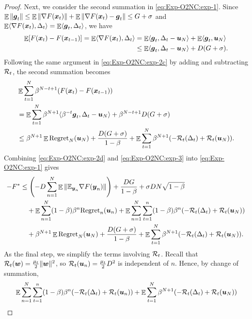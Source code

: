 \begin{proof}
Next, we consider the second summation in \eqref{eq:Exp-O2NC:exp-1}. Since $\mathop{\mathbb{E}}\|{\boldsymbol{g}}_t\| \le \mathop{\mathbb{E}}\|\nabla F({\boldsymbol{x}}_t)\| + \mathop{\mathbb{E}}\|\nabla F({\boldsymbol{x}}_t)-{\boldsymbol{g}}_t\| \le G+\sigma$ and $\mathop{\mathbb{E}}\langle \nabla F({\boldsymbol{x}}_t),\Delta_t\rangle = \mathop{\mathbb{E}}\langle {\boldsymbol{g}}_t,\Delta_t\rangle$, we have
\begin{align*}
    \mathop{\mathbb{E}}[F({\boldsymbol{x}}_t) - F({\boldsymbol{x}}_{t-1})]
    = \mathop{\mathbb{E}}\langle \nabla F({\boldsymbol{x}}_t),\Delta_t\rangle 
    &= \mathop{\mathbb{E}}\langle {\boldsymbol{g}}_t, \Delta_t - {\boldsymbol{u}}_N\rangle + \mathop{\mathbb{E}}\langle {\boldsymbol{g}}_t, {\boldsymbol{u}}_N\rangle \\
    &\le \mathop{\mathbb{E}}\langle {\boldsymbol{g}}_t,\Delta_t-{\boldsymbol{u}}_N\rangle + D(G+\sigma).
\end{align*}
Following the same argument in \eqref{eq:Exp-O2NC:exp-2c} by adding and subtracting ${\cal R}_t$, the second summation becomes
\begin{align}
    &\mathop{\mathbb{E}}\sum_{t=1}^N \beta^{N-t+1} (F({\boldsymbol{x}}_t) - F({\boldsymbol{x}}_{t-1})) \notag\\
    &= \mathop{\mathbb{E}}\sum_{t=1}^N \beta^{N+1} \langle \beta^{-t}{\boldsymbol{g}}_t,\Delta_t-{\boldsymbol{u}}_N\rangle + \beta^{N-t+1} D(G+\sigma) \notag\\
    &\le \beta^{N+1} \mathop{\mathbb{E}}\mathrm{Regret}_N({\boldsymbol{u}}_N) + \frac{D(G+\sigma)}{1-\beta} + \mathop{\mathbb{E}}\sum_{t=1}^N \beta^{N+1} (-{\cal R}_t(\Delta_t) + {\cal R}_t({\boldsymbol{u}}_N)).
    \label{eq:Exp-O2NC:exp-3}
\end{align}
Combining \eqref{eq:Exp-O2NC:exp-2d} and \eqref{eq:Exp-O2NC:exp-3} into \eqref{eq:Exp-O2NC:exp-1} gives
\begin{align}
    -F^*
    &\le \left(-D\sum_{n=1}^N \mathop{\mathbb{E}} \|\mathbb{E}_{{\boldsymbol{y}}_n} \nabla F({\boldsymbol{y}}_n)\| \right) + \frac{DG}{1-\beta} + \sigma DN\sqrt{1-\beta} \notag\\
    &\quad + \mathop{\mathbb{E}}\sum_{n=1}^N (1-\beta)\beta^n \mathrm{Regret}_n({\boldsymbol{u}}_n) + \mathop{\mathbb{E}}\sum_{n=1}^N\sum_{t=1}^n (1-\beta)\beta^n ( -{\cal R}_t(\Delta_t) + {\cal R}_t({\boldsymbol{u}}_N)) \notag\\
    &\quad + \beta^{N+1} \mathop{\mathbb{E}}\mathrm{Regret}_N({\boldsymbol{u}}_N) + \frac{D(G+\sigma)}{1-\beta} + \mathop{\mathbb{E}}\sum_{t=1}^N \beta^{N+1} (-{\cal R}_t(\Delta_t) + {\cal R}_t({\boldsymbol{u}}_N)).
    \label{eq:Exp-O2NC:exp-4}
\end{align}
As the final step, we simplify the terms involving ${\cal R}_t$. 
Recall that ${\cal R}_t({\boldsymbol{w}}) = \frac{\mu_t}{2}\|{\boldsymbol{w}}\|^2$, so ${\cal R}_t({\boldsymbol{u}}_n)=\frac{\mu_t}{2}D^2$ is independent of $n$. Hence, by change of summation,
\begin{align*}
    &\E\sum_{n=1}^N\sum_{t=1}^n (1-\beta)\beta^n ( -\calR_t(\Delta_t) + \calR_t(\vecu_n)) + \E\sum_{t=1}^N \beta^{N+1} (-\calR_t(\Delta_t) + \calR_t(\vecu_N)) \\

\end{align*}
\end{proof}
